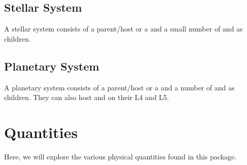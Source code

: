 \documentclass[letterpaper,10pt,english]{sphinxmanual}
\begin{document}
\section{Stellar System}
\label{\detokenize{celestial_systems/stellar_system:stellar-system}}\label{\detokenize{celestial_systems/stellar_system::doc}}\label{\detokenize{celestial_systems/stellar_system:id1}}
\sphinxAtStartPar
A stellar system consists of a parent/host {\hyperref[\detokenize{celestial_bodies/star:id1}]{}} or
a {\hyperref[\detokenize{celestial_systems/binary_system:id1}]{}} and a small number of
{\hyperref[\detokenize{celestial_systems/planetary_system:id1}]{}} and {\hyperref[\detokenize{celestial_bodies/asteroid_belt:id1}]{}} as children.


\section{Planetary System}
\label{\detokenize{celestial_systems/planetary_system:planetary-system}}\label{\detokenize{celestial_systems/planetary_system::doc}}\label{\detokenize{celestial_systems/planetary_system:id1}}
\sphinxAtStartPar
A planetary system consists of a parent/host {\hyperref[\detokenize{celestial_bodies/planet:id1}]{}} or
a {\hyperref[\detokenize{celestial_systems/binary_system:id1}]{}} and a number of
{\hyperref[\detokenize{celestial_bodies/satellite:id1}]{}} and {\hyperref[\detokenize{celestial_bodies/ring:id1}]{}} as children.
They can also host  {\hyperref[\detokenize{celestial_bodies/trojan:id1}]{}} and {\hyperref[\detokenize{celestial_bodies/trojan_satellite:id1}]{}}
on their {\hyperref[\detokenize{quantities/orbital/lagrange_position:id1}]{}} L4 and L5.


\chapter{Quantities}
\label{\detokenize{quantities/quantities:quantities}}\label{\detokenize{quantities/quantities::doc}}
\sphinxAtStartPar
Here, we will explore the various physical quantities found in this package.
\end{document}
